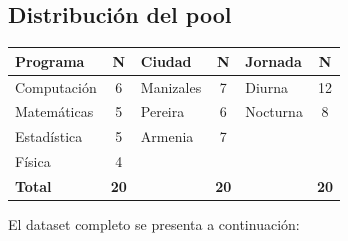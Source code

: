 \documentclass[12pt, a4paper]{article}
\begin{document}
\subsection{Distribución del pool}

\begin{center}
\begin{tabular}{lc|lc|lc}
  \toprule
  \textbf{Programa} & \textbf{N} & \textbf{Ciudad} & \textbf{N} & \textbf{Jornada} & \textbf{N} \\
  \midrule
  Computación  & 6 & Manizales & 7 & Diurna   & 12 \\
  Matemáticas  & 5 & Pereira   & 6 & Nocturna &  8 \\
  Estadística  & 5 & Armenia   & 7 & & \\
  Física       & 4 & & & & \\
  \midrule
  \textbf{Total} & \textbf{20} & & \textbf{20} & & \textbf{20} \\
  \bottomrule
\end{tabular}
\end{center}

\vspace{0.4cm}

El dataset completo se presenta a continuación:
\end{document}
